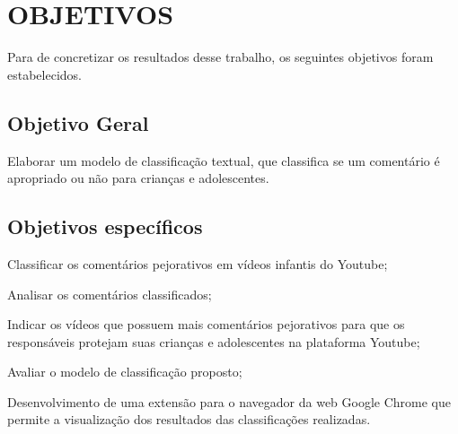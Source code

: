 \newpage
\section{OBJETIVOS}

Para de concretizar os resultados desse trabalho, os seguintes objetivos foram estabelecidos.

\subsection{Objetivo Geral}

Elaborar um modelo de classificação textual, que classifica se um comentário é apropriado ou não para crianças e adolescentes.

\begin{comment}
Example inline comment
\end{comment}

\subsection{Objetivos específicos}

\begin{alineas}
    
    \item Classificar os comentários pejorativos em vídeos infantis do Youtube;
    \item Analisar os comentários classificados;
    \item Indicar os vídeos que possuem mais comentários pejorativos para que os responsáveis protejam suas crianças e adolescentes na plataforma Youtube; 
    \item Avaliar o modelo de classificação proposto;
    \item Desenvolvimento de uma extensão para o navegador da web Google Chrome que permite a visualização dos resultados das classificações realizadas.
    
\end{alineas}
